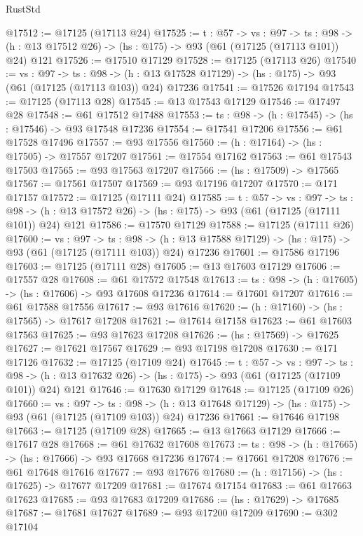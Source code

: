 \begin{lexlean}{RustStd}
\begin{coremodule}
@17512 := @17125 (@17113 @24)
@17525 := {t : @57} ->
  {vs : @97} ->
  {ts : @98} -> (h : @13 @17512 @26) -> (hs : @175) -> @93 (@61 (@17125 (@17113 @101)) @24) @121
@17526 := @17510 @17129
@17528 := @17125 (@17113 @26)
@17540 := {vs : @97} ->
  {ts : @98} ->
  (h : @13 @17528 @17129) -> (hs : @175) -> @93 (@61 (@17125 (@17113 @103)) @24) @17236
@17541 := @17526 @17194
@17543 := @17125 (@17113 @28)
@17545 := @13 @17543 @17129
@17546 := @17497 @28
@17548 := @61 @17512 @17488
@17553 := {ts : @98} -> (h : @17545) -> (hs : @17546) -> @93 @17548 @17236
@17554 := @17541 @17206
@17556 := @61 @17528 @17496
@17557 := @93 @17556
@17560 := (h : @17164) -> (hs : @17505) -> @17557 @17207
@17561 := @17554 @17162
@17563 := @61 @17543 @17503
@17565 := @93 @17563 @17207
@17566 := (hs : @17509) -> @17565
@17567 := @17561 @17507
@17569 := @93 @17196 @17207
@17570 := @171 @17157
@17572 := @17125 (@17111 @24)
@17585 := {t : @57} ->
  {vs : @97} ->
  {ts : @98} -> (h : @13 @17572 @26) -> (hs : @175) -> @93 (@61 (@17125 (@17111 @101)) @24) @121
@17586 := @17570 @17129
@17588 := @17125 (@17111 @26)
@17600 := {vs : @97} ->
  {ts : @98} ->
  (h : @13 @17588 @17129) -> (hs : @175) -> @93 (@61 (@17125 (@17111 @103)) @24) @17236
@17601 := @17586 @17196
@17603 := @17125 (@17111 @28)
@17605 := @13 @17603 @17129
@17606 := @17557 @28
@17608 := @61 @17572 @17548
@17613 := {ts : @98} -> (h : @17605) -> (hs : @17606) -> @93 @17608 @17236
@17614 := @17601 @17207
@17616 := @61 @17588 @17556
@17617 := @93 @17616
@17620 := (h : @17160) -> (hs : @17565) -> @17617 @17208
@17621 := @17614 @17158
@17623 := @61 @17603 @17563
@17625 := @93 @17623 @17208
@17626 := (hs : @17569) -> @17625
@17627 := @17621 @17567
@17629 := @93 @17198 @17208
@17630 := @171 @17126
@17632 := @17125 (@17109 @24)
@17645 := {t : @57} ->
  {vs : @97} ->
  {ts : @98} -> (h : @13 @17632 @26) -> (hs : @175) -> @93 (@61 (@17125 (@17109 @101)) @24) @121
@17646 := @17630 @17129
@17648 := @17125 (@17109 @26)
@17660 := {vs : @97} ->
  {ts : @98} ->
  (h : @13 @17648 @17129) -> (hs : @175) -> @93 (@61 (@17125 (@17109 @103)) @24) @17236
@17661 := @17646 @17198
@17663 := @17125 (@17109 @28)
@17665 := @13 @17663 @17129
@17666 := @17617 @28
@17668 := @61 @17632 @17608
@17673 := {ts : @98} -> (h : @17665) -> (hs : @17666) -> @93 @17668 @17236
@17674 := @17661 @17208
@17676 := @61 @17648 @17616
@17677 := @93 @17676
@17680 := (h : @17156) -> (hs : @17625) -> @17677 @17209
@17681 := @17674 @17154
@17683 := @61 @17663 @17623
@17685 := @93 @17683 @17209
@17686 := (hs : @17629) -> @17685
@17687 := @17681 @17627
@17689 := @93 @17200 @17209
@17690 := @302 @17104

\end{coremodule}
\end{lexlean}
